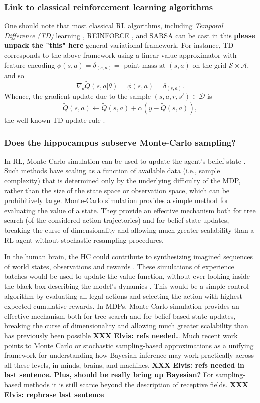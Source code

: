 \documentclass[10pt,letterpaper]{article}
\begin{document}
\subsubsection{Link to classical reinforcement learning algorithms}
One should note that most classical RL algorithms, including \textit{Temporal Difference (TD)}
learning \citep{sutton1998reinforcement}, REINFORCE \citep{williams1992}, and SARSA can be
cast in this \textbf{please unpack the "this" here}
general variational framework. For instance, TD corresponds to
the above framework using a linear value approximator with feature encoding
$\phi(s,a) = \delta_{(s,a)} =  \text{ point mass at }(s,a)$ on the grid
$\mathcal S \times \mathcal A$, and so
$$\nabla_{\theta}\tilde{Q}(s, a|\theta) = \phi(s, a) = \delta_{(s,a)}.$$
Whence, the gradient update due to the sample $(s,a,r,s') \in \mathcal D$ is
$$\tilde{Q}(s, a) \leftarrow \tilde{Q}(s, a) + \alpha(y-\tilde{Q}(s, a)),$$
the well-known TD update rule \citep{sutton1998reinforcement}.

\subsubsection{Does the hippocampus subserve Monte-Carlo sampling?}
In RL, Monte-Carlo simulation can be used to update the agent's belief state
\citep{silver2010monte}.
Such methods have scaling as a function of available data (i.e., sample complexity) that
is determined only by the underlying difficulty of the MDP, rather than the size of the state space or observation space,
which can be prohibitively large.
Monte-Carlo simulation provides a simple method for evaluating the value of a state.
They provide an effective mechanism both for tree search (of the considered
action trajectories)
and for belief state updates, breaking the curse of dimensionality and allowing much greater scalability than a RL agent without stochastic resampling procedures.

In the human brain,
the HC could contribute to synthesizing imagined sequences of world states,
observations and rewards \citep{aronov2017, chao2017interaction, boyer2008evolutionary}.
These simulations of experience batches
would be used to update the value function, without ever looking inside the black box describing the model's dynamics \citep{lavilleon2015}.
This would be a simple control algorithm by evaluating all legal actions and selecting the action with
highest expected cumulative rewards.
In MDPs, Monte-Carlo simulation provides an effective mechanism both for tree search and for belief-based state updates, breaking the curse of dimensionality and allowing much greater scalability than has previously been possible
\textbf{XXX Elvis: refs needed.}.
Much recent work points to Monte Carlo or stochastic sampling-based approximations as a unifying framework for understanding how Bayesian inference may work practically across all these levels, in minds, brains, and machines. \textbf{XXX Elvis: refs needed in last sentence. Plus, should be really bring up Bayesian?} For sampling-based methods it is still scarce
beyond the description of receptive fields. \textbf{XXX Elvis: rephrase last sentence}
\end{document}
